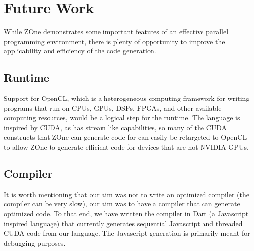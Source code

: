 \section{Future Work}

While ZOne demonstrates some important features of an effective parallel
programming environment, there is plenty of opportunity to improve the
applicability and efficiency of the code generation.

\subsection{Runtime}

Support for OpenCL, which is a heterogeneous computing framework for writing programs that run
on CPUs, GPUs, DSPs, FPGAs, and other available computing resources, would be a logical step for the runtime. The
language is inspired by CUDA, as has stream like capabilities, so many of the CUDA constructs that ZOne can
generate code for can easily be retargeted to OpenCL to allow ZOne to generate
efficient code for devices that are not NVIDIA GPUs. 

\subsection{Compiler}

It is worth mentioning that our aim was not to write an optimized
compiler (the compiler can be very slow), our aim was to have a compiler
that can generate optimized code. To that end, we have written the
compiler in Dart (a Javascript inspired language) that currently
generates sequential Javascript and threaded CUDA code from our language.
The Javascript
generation is primarily meant for debugging purposes.

